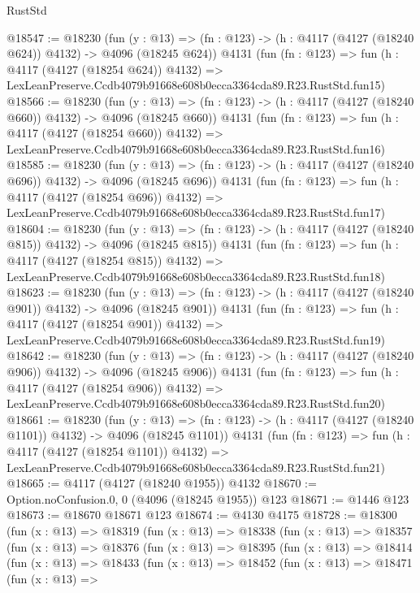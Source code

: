 \begin{lexlean}{RustStd}
\begin{coremodule}
@18547 := @18230
    (fun (y : @13) => (fn : @123) -> (h : @4117 (@4127 (@18240 @624)) @4132) -> @4096 (@18245 @624))
    @4131
    (fun (fn : @123) =>
    fun (h : @4117 (@4127 (@18254 @624)) @4132) =>
    LexLeanPreserve.Ccdb4079b91668e608b0ecca3364cda89.R23.RustStd.fun15)
@18566 := @18230
    (fun (y : @13) => (fn : @123) -> (h : @4117 (@4127 (@18240 @660)) @4132) -> @4096 (@18245 @660))
    @4131
    (fun (fn : @123) =>
    fun (h : @4117 (@4127 (@18254 @660)) @4132) =>
    LexLeanPreserve.Ccdb4079b91668e608b0ecca3364cda89.R23.RustStd.fun16)
@18585 := @18230
    (fun (y : @13) => (fn : @123) -> (h : @4117 (@4127 (@18240 @696)) @4132) -> @4096 (@18245 @696))
    @4131
    (fun (fn : @123) =>
    fun (h : @4117 (@4127 (@18254 @696)) @4132) =>
    LexLeanPreserve.Ccdb4079b91668e608b0ecca3364cda89.R23.RustStd.fun17)
@18604 := @18230
    (fun (y : @13) => (fn : @123) -> (h : @4117 (@4127 (@18240 @815)) @4132) -> @4096 (@18245 @815))
    @4131
    (fun (fn : @123) =>
    fun (h : @4117 (@4127 (@18254 @815)) @4132) =>
    LexLeanPreserve.Ccdb4079b91668e608b0ecca3364cda89.R23.RustStd.fun18)
@18623 := @18230
    (fun (y : @13) => (fn : @123) -> (h : @4117 (@4127 (@18240 @901)) @4132) -> @4096 (@18245 @901))
    @4131
    (fun (fn : @123) =>
    fun (h : @4117 (@4127 (@18254 @901)) @4132) =>
    LexLeanPreserve.Ccdb4079b91668e608b0ecca3364cda89.R23.RustStd.fun19)
@18642 := @18230
    (fun (y : @13) => (fn : @123) -> (h : @4117 (@4127 (@18240 @906)) @4132) -> @4096 (@18245 @906))
    @4131
    (fun (fn : @123) =>
    fun (h : @4117 (@4127 (@18254 @906)) @4132) =>
    LexLeanPreserve.Ccdb4079b91668e608b0ecca3364cda89.R23.RustStd.fun20)
@18661 := @18230
    (fun (y : @13) =>
    (fn : @123) -> (h : @4117 (@4127 (@18240 @1101)) @4132) -> @4096 (@18245 @1101))
    @4131
    (fun (fn : @123) =>
    fun (h : @4117 (@4127 (@18254 @1101)) @4132) =>
    LexLeanPreserve.Ccdb4079b91668e608b0ecca3364cda89.R23.RustStd.fun21)
@18665 := @4117 (@4127 (@18240 @1955)) @4132
@18670 := Option.noConfusion.{0, 0} (@4096 (@18245 @1955)) @123
@18671 := @1446 @123
@18673 := @18670 @18671 @123
@18674 := @4130 @4175
@18728 := @18300
    (fun (x : @13) =>
    @18319
      (fun (x : @13) =>
      @18338
        (fun (x : @13) =>
        @18357
          (fun (x : @13) =>
          @18376
            (fun (x : @13) =>
            @18395
              (fun (x : @13) =>
              @18414
                (fun (x : @13) =>
                @18433
                  (fun (x : @13) =>
                  @18452
                    (fun (x : @13) =>
                    @18471
                      (fun (x : @13) =>

\end{coremodule}
\end{lexlean}
